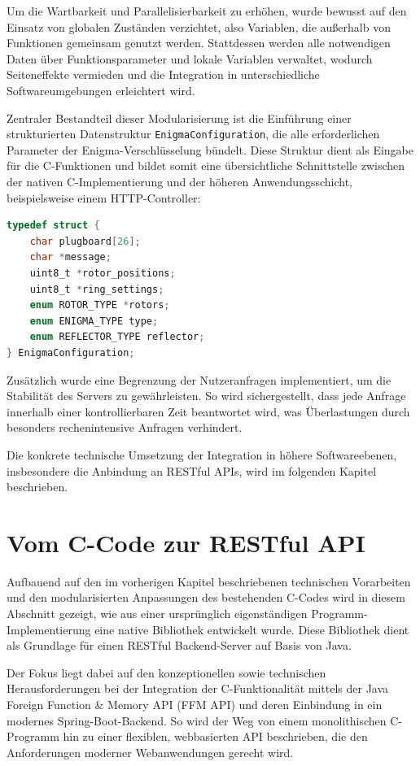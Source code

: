 \documentclass[12pt, ngerman, a4paper, numbers=noenddot]{article}
\begin{document}
Um die Wartbarkeit und Parallelisierbarkeit zu erhöhen, wurde bewusst auf den Einsatz von globalen Zuständen verzichtet, also Variablen, die außerhalb von Funktionen gemeinsam genutzt werden. Stattdessen werden alle notwendigen Daten über Funktionsparameter und lokale Variablen verwaltet, wodurch Seiteneffekte vermieden und die Integration in unterschiedliche Softwareumgebungen erleichtert wird.


Zentraler Bestandteil dieser Modularisierung ist die Einführung einer strukturierten Datenstruktur \lstinline|EnigmaConfiguration|, die alle erforderlichen Parameter der Enigma-Verschlüsselung bündelt. Diese Struktur dient als Eingabe für die C-Funktionen und bildet somit eine übersichtliche Schnittstelle zwischen der nativen C-Implementierung und der höheren Anwendungsschicht, beispielsweise einem HTTP-Controller:

\begin{lstlisting}[language=C, caption={Struct \lstinline|EnigmaConfiguration| in C}, label={lst:enigma-c}]
typedef struct {
	char plugboard[26];
	char *message;
	uint8_t *rotor_positions;
	uint8_t *ring_settings;
	enum ROTOR_TYPE *rotors;
	enum ENIGMA_TYPE type;
	enum REFLECTOR_TYPE reflector;
} EnigmaConfiguration;
\end{lstlisting}

Zusätzlich wurde eine Begrenzung der Nutzeranfragen implementiert, um die Stabilität des Servers zu gewährleisten. So wird sichergestellt, dass jede Anfrage innerhalb einer kontrollierbaren Zeit beantwortet wird, was Überlastungen durch besonders rechenintensive Anfragen verhindert.

Die konkrete technische Umsetzung der Integration in höhere Softwareebenen, insbesondere die Anbindung an RESTful APIs, wird im folgenden Kapitel beschrieben.

 
\newpage


\section{Vom C-Code zur RESTful API}

Aufbauend auf den im vorherigen Kapitel beschriebenen technischen Vorarbeiten und den modularisierten Anpassungen des bestehenden C-Codes wird in diesem Abschnitt gezeigt, wie aus einer ursprünglich eigenständigen Programm-Implementierung eine native Bibliothek entwickelt wurde. Diese Bibliothek dient als Grundlage für einen RESTful Backend-Server auf Basis von Java.

Der Fokus liegt dabei auf den konzeptionellen sowie technischen Herausforderungen bei der Integration der C-Funktionalität mittels der Java Foreign Function \& Memory API (FFM API) und deren Einbindung in ein modernes Spring-Boot-Backend. So wird der Weg von einem monolithischen C-Programm hin zu einer flexiblen, webbasierten API beschrieben, die den Anforderungen moderner Webanwendungen gerecht wird.
\end{document}
